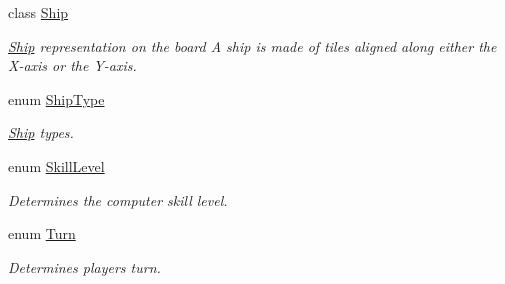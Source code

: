 \begin{DoxyCompactItemize}
class \hyperlink{classbattleship2D_1_1model_1_1Ship}{Ship}
\begin{DoxyCompactList}\small\item\em \hyperlink{classbattleship2D_1_1model_1_1Ship}{Ship} representation on the board A ship is made of tiles aligned along either the X-\/axis or the Y-\/axis. \end{DoxyCompactList}\item 
enum \hyperlink{enumbattleship2D_1_1model_1_1ShipType}{Ship\-Type}
\begin{DoxyCompactList}\small\item\em \hyperlink{classbattleship2D_1_1model_1_1Ship}{Ship} types. \end{DoxyCompactList}\item 
enum \hyperlink{enumbattleship2D_1_1model_1_1SkillLevel}{Skill\-Level}
\begin{DoxyCompactList}\small\item\em Determines the computer skill level. \end{DoxyCompactList}\item 
enum \hyperlink{enumbattleship2D_1_1model_1_1Turn}{Turn}
\begin{DoxyCompactList}\small\item\em Determines players turn. \end{DoxyCompactList}\end{DoxyCompactItemize}
